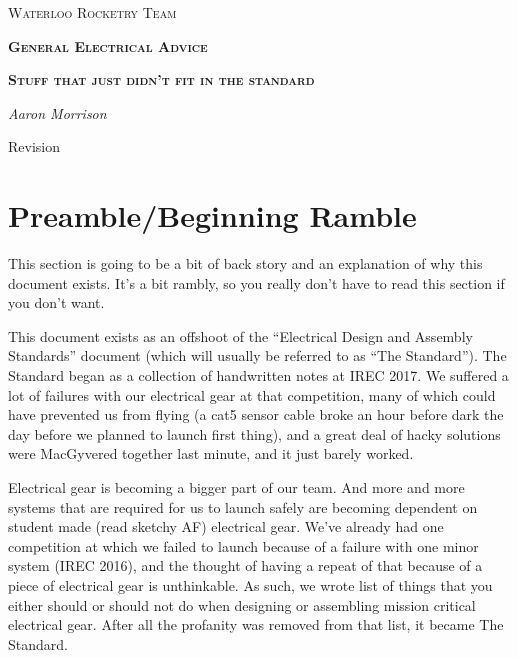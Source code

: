 \documentclass{article}
\date{\today}
\begin{document}
\begin{titlepage}
	\centering
	{\scshape\Huge Waterloo Rocketry Team \par}
	\vspace{1.5cm}
	{\scshape\bfseries\LARGE General Electrical Advice\par}
	\vspace{1.5cm}
	{\scshape\bfseries Stuff that just didn't fit in the standard\par}
	\vspace{2.5cm}
	{\Large\itshape Aaron Morrison\par}
	\vfill

	{\large \makeatletter\@date\par Revision \version}
    \par
\end{titlepage}

\section{Preamble/Beginning Ramble}
This section is going to be a bit of back story and an explanation of why this document exists. It's a bit rambly, so you really don't have to read this section if you don't want.

This document exists as an offshoot of the ``Electrical Design and Assembly Standards'' document (which will usually be referred to as ``The Standard''). The Standard began as a collection of handwritten notes at IREC 2017. We suffered a lot of failures with our electrical gear at that competition, many of which could have prevented us from flying (a cat5 sensor cable broke an hour before dark the day before we planned to launch first thing), and a great deal of hacky solutions were MacGyvered together last minute, and it just barely worked.

Electrical gear is becoming a bigger part of our team. And more and more systems that are required for us to launch safely are becoming dependent on student made (read sketchy AF) electrical gear. We've already had one competition at which we failed to launch because of a failure with one minor system (IREC 2016), and the thought of having a repeat of that because of a piece of electrical gear is unthinkable. As such, we wrote list of things that you either should or should not do when designing or assembling mission critical electrical gear. After all the profanity was removed from that list, it became The Standard.
\end{document}
